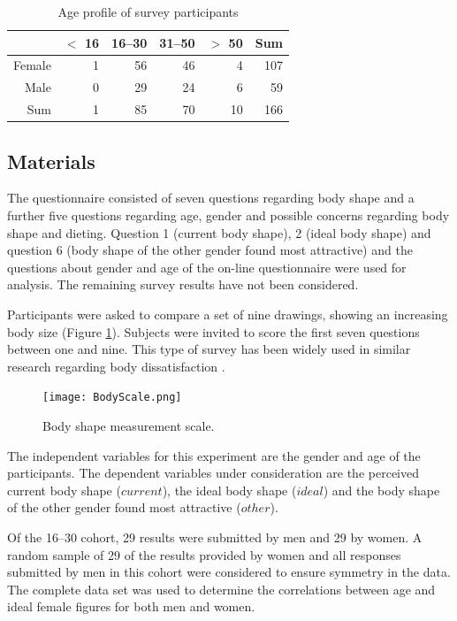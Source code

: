 \documentclass[a4paper, jou]{apa6}
\begin{document}
\begin{table}[ht]
\centering
\begin{tabular}{rrrrrr}
  \hline
 & $<$ 16 & 16--30 & 31--50 & $>$ 50 & Sum \\ 
  \hline
Female & 1 & 56 & 46 & 4 & 107 \\ 
  Male & 0 & 29 & 24 & 6 & 59 \\ 
  Sum & 1 & 85 & 70 & 10 & 166 \\ 
   \hline
\end{tabular}
\caption{Age profile of survey participants} 
\label{gender-age}
\end{table}

\subsection{Materials}
\label{sec:org8eeb05b}
The questionnaire consisted of seven questions regarding body shape and a further five questions regarding age, gender and possible concerns regarding body shape and dieting. Question 1 (current body shape), 2 (ideal body shape) and question 6 (body shape of the other gender found most attractive) and the questions about gender and age of the on-line questionnaire were used for analysis. The remaining survey results have not been considered.

Participants were asked to compare a set of nine drawings, showing an increasing body size (Figure \ref{scale}). Subjects were invited to score the first seven questions between one and nine. This type of survey has been widely used in similar research regarding body dissatisfaction \cite{abel_relationship_1996,byrne_should_1996,fallon_sex_1985,fear_prevalence_1996,hill_eating_1992,lamb_body_1993,tiggeman_development_1990,tiggeman_body-size_1992}. 

\begin{figure}[htbp]
\centering
\texttt{[image: BodyScale.png]}
\caption{Body shape measurement scale. \label{scale}}
\end{figure}

The independent variables for this experiment are the gender and age of the participants. The dependent variables under consideration are the perceived current body shape (\(current\)), the ideal body shape (\(ideal\)) and the body shape of the other gender found most attractive (\(other\)). 

Of the 16--30 cohort, 29 results were submitted by men and 29 by women. A random sample of 29 of the results provided by women and all responses submitted by men in this cohort were considered to ensure symmetry in the data. The complete data set was used to determine the correlations between age and ideal female figures for both men and women.
\end{document}
